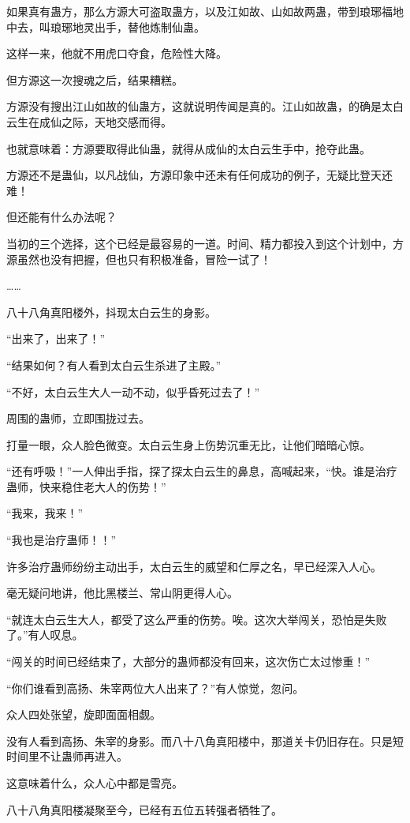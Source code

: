 \begin{this_body}
如果真有蛊方，那么方源大可盗取蛊方，以及江如故、山如故两蛊，带到琅琊福地中去，叫琅琊地灵出手，替他炼制仙蛊。

这样一来，他就不用虎口夺食，危险性大降。

但方源这一次搜魂之后，结果糟糕。

方源没有搜出江山如故的仙蛊方，这就说明传闻是真的。江山如故蛊，的确是太白云生在成仙之际，天地交感而得。

也就意味着：方源要取得此仙蛊，就得从成仙的太白云生手中，抢夺此蛊。

方源还不是蛊仙，以凡战仙，方源印象中还未有任何成功的例子，无疑比登天还难！

但还能有什么办法呢？

当初的三个选择，这个已经是最容易的一道。时间、精力都投入到这个计划中，方源虽然也没有把握，但也只有积极准备，冒险一试了！

……

八十八角真阳楼外，抖现太白云生的身影。

“出来了，出来了！”

“结果如何？有人看到太白云生杀进了主殿。”

“不好，太白云生大人一动不动，似乎昏死过去了！”

周围的蛊师，立即围拢过去。

打量一眼，众人脸色微变。太白云生身上伤势沉重无比，让他们暗暗心惊。

“还有呼吸！”一人伸出手指，探了探太白云生的鼻息，高喊起来，“快。谁是治疗蛊师，快来稳住老大人的伤势！”

“我来，我来！”

“我也是治疗蛊师！！”

许多治疗蛊师纷纷主动出手，太白云生的威望和仁厚之名，早已经深入人心。

毫无疑问地讲，他比黑楼兰、常山阴更得人心。

“就连太白云生大人，都受了这么严重的伤势。唉。这次大举闯关，恐怕是失败了。”有人叹息。

“闯关的时间已经结束了，大部分的蛊师都没有回来，这次伤亡太过惨重！”

“你们谁看到高扬、朱宰两位大人出来了？”有人惊觉，忽问。

众人四处张望，旋即面面相觑。

没有人看到高扬、朱宰的身影。而八十八角真阳楼中，那道关卡仍旧存在。只是短时间里不让蛊师再进入。

这意味着什么，众人心中都是雪亮。

八十八角真阳楼凝聚至今，已经有五位五转强者牺牲了。


\end{this_body}

